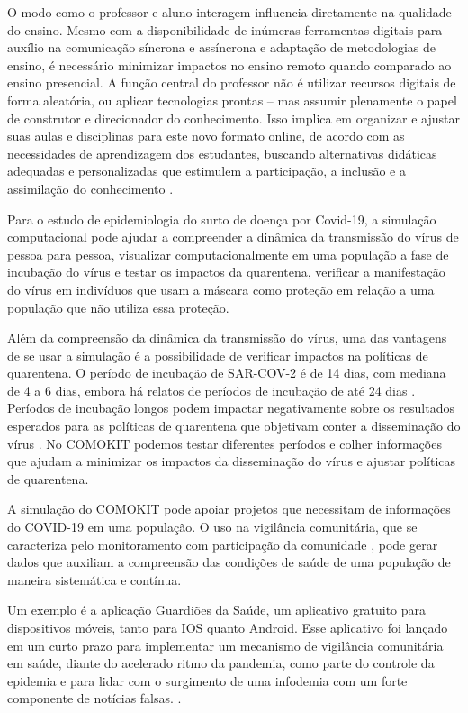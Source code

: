 O modo como o professor e aluno interagem influencia diretamente na qualidade do ensino. Mesmo com a disponibilidade de inúmeras ferramentas digitais para auxílio na comunicação síncrona e assíncrona e adaptação de metodologias de ensino, é necessário minimizar impactos no ensino remoto quando comparado ao ensino presencial. A função central do professor não é utilizar recursos digitais de forma aleatória, ou aplicar tecnologias prontas – mas assumir plenamente o papel de construtor e direcionador do conhecimento. Isso implica em organizar e ajustar suas aulas e disciplinas para este novo formato online, de acordo com as necessidades de aprendizagem dos estudantes, buscando alternativas didáticas adequadas e personalizadas que estimulem a participação, a inclusão e a assimilação do conhecimento \cite{santos2021covid}.

Para o estudo de epidemiologia do surto de doença por Covid-19, a simulação computacional pode ajudar a compreender a dinâmica da transmissão do vírus de pessoa para pessoa, visualizar computacionalmente em uma população a fase de incubação do vírus e testar os impactos da quarentena, verificar a manifestação do vírus em indivíduos que usam a máscara como proteção em relação a uma população que não utiliza essa proteção.

Além da compreensão da dinâmica da transmissão do vírus, uma das vantagens de se usar a simulação é a possibilidade de verificar impactos na políticas de quarentena. O período de incubação de SAR-COV-2 é de 14 dias, com mediana de 4 a 6 dias, embora há relatos de períodos de incubação de até 24 dias \cite{kang2020impact}. Períodos de incubação longos podem impactar negativamente sobre os resultados esperados para as políticas de quarentena que objetivam conter a disseminação do vírus \cite{netto2020epidemiologia}. No COMOKIT podemos testar diferentes períodos e colher informações que ajudam a minimizar os impactos da disseminação do vírus e ajustar políticas de quarentena.

A simulação do COMOKIT pode apoiar projetos que necessitam de informações do COVID-19 em uma população. O uso na vigilância comunitária, que se caracteriza pelo monitoramento com participação da comunidade \cite{oliveira2021equipe}, pode gerar dados que auxiliam a compreensão das condições de saúde de uma população de maneira sistemática e contínua.

Um exemplo é a aplicação Guardiões da Saúde, um aplicativo gratuito para dispositivos móveis, tanto para IOS quanto Android. Esse aplicativo foi lançado em um curto prazo para implementar um mecanismo de vigilância comunitária em saúde, diante do acelerado ritmo da pandemia, como parte do controle da epidemia e para lidar com o surgimento de uma infodemia com um forte componente de notícias falsas. \cite{oliveira2021equipe}.

